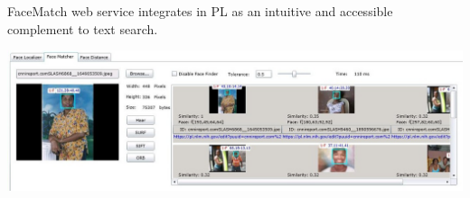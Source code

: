 
\begin{xpsectionbox}{}{}
FaceMatch web service integrates in PL as an intuitive and accessible complement to text search.

\begin{minipage}{0.6\linewidth}
\begin{center}
	\includegraphics[height=0.45\linewidth]{images/web_interface}
\end{center}
\end{minipage}

%
%
%
%
%

\end{xpsectionbox}
